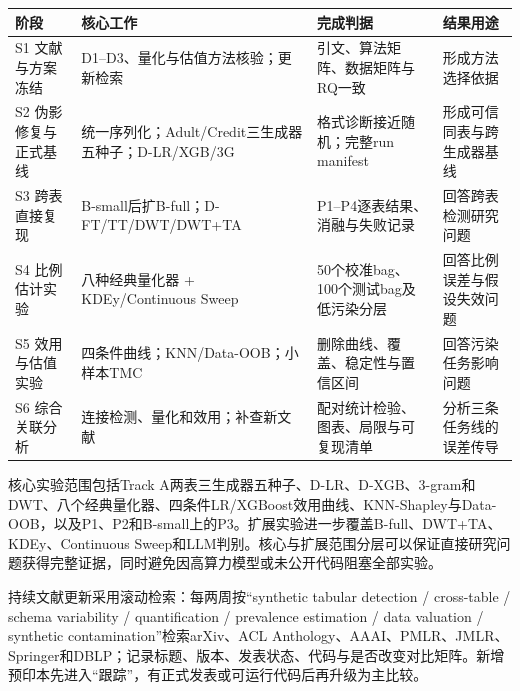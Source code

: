 \documentclass[
  chinese,
  12pt,
  a4paper,
  chinese,
  UTF8]{ctexart}
\begin{document}
\begin{longtable}[]{@{}
  >{\raggedright\arraybackslash}p{}
  >{\raggedright\arraybackslash}p{}
  >{\raggedright\arraybackslash}p{}
  >{\raggedright\arraybackslash}p{}@{}}
\toprule\noalign{}
\begin{minipage}[b]{\linewidth}\raggedright
阶段
\end{minipage} & \begin{minipage}[b]{\linewidth}\raggedright
核心工作
\end{minipage} & \begin{minipage}[b]{\linewidth}\raggedright
完成判据
\end{minipage} & \begin{minipage}[b]{\linewidth}\raggedright
结果用途
\end{minipage} \\
\midrule\noalign{}
\endhead
\bottomrule\noalign{}
\endlastfoot
S1 文献与方案冻结 & D1--D3、量化与估值方法核验；更新检索 &
引文、算法矩阵、数据矩阵与RQ一致 & 形成方法选择依据 \\
S2 伪影修复与正式基线 &
统一序列化；Adult/Credit三生成器五种子；D-LR/XGB/3G &
格式诊断接近随机；完整run manifest & 形成可信同表与跨生成器基线 \\
S3 跨表直接复现 & B-small后扩B-full；D-FT/TT/DWT/DWT+TA &
P1--P4逐表结果、消融与失败记录 & 回答跨表检测研究问题 \\
S4 比例估计实验 & 八种经典量化器 + KDEy/Continuous Sweep &
50个校准bag、100个测试bag及低污染分层 & 回答比例误差与假设失效问题 \\
S5 效用与估值实验 & 四条件曲线；KNN/Data-OOB；小样本TMC &
删除曲线、覆盖、稳定性与置信区间 & 回答污染任务影响问题 \\
S6 综合关联分析 & 连接检测、量化和效用；补查新文献 &
配对统计检验、图表、局限与可复现清单 & 分析三条任务线的误差传导 \\
\end{longtable}

核心实验范围包括Track
A两表三生成器五种子、D-LR、D-XGB、3-gram和DWT、八个经典量化器、四条件LR/XGBoost效用曲线、KNN-Shapley与Data-OOB，以及P1、P2和B-small上的P3。扩展实验进一步覆盖B-full、DWT+TA、KDEy、Continuous
Sweep和LLM判别。核心与扩展范围分层可以保证直接研究问题获得完整证据，同时避免因高算力模型或未公开代码阻塞全部实验。

持续文献更新采用滚动检索：每两周按``synthetic tabular detection /
cross-table / schema variability / quantification / prevalence
estimation / data valuation / synthetic contamination''检索arXiv、ACL
Anthology、AAAI、PMLR、JMLR、Springer和DBLP；记录标题、版本、发表状态、代码与是否改变对比矩阵。新增预印本先进入``跟踪''，有正式发表或可运行代码后再升级为主比较。
\end{document}
